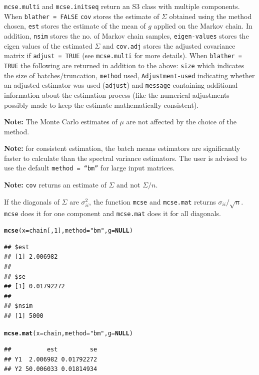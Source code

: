 \documentclass[11pt]{article}\usepackage[]{graphicx}\usepackage[]{color}
\makeatletter
\newcommand{\hlnum}[1]{\textcolor[rgb]{0.686,0.059,0.569}{#1}}%
\newcommand{\hlstr}[1]{\textcolor[rgb]{0.192,0.494,0.8}{#1}}%
\newcommand{\hlstd}[1]{\textcolor[rgb]{0.345,0.345,0.345}{#1}}%
\newcommand{\hlkwa}[1]{\textcolor[rgb]{0.161,0.373,0.58}{\textbf{#1}}}%
\newcommand{\hlkwc}[1]{\textcolor[rgb]{0.333,0.667,0.333}{#1}}%
\newcommand{\hlkwd}[1]{\textcolor[rgb]{0.737,0.353,0.396}{\textbf{#1}}}%
\newenvironment{kframe}{%
 \def\at@end@of@kframe{}%
 \ifinner\ifhmode%
  \def\at@end@of@kframe{\end{minipage}}%
  \begin{minipage}{\columnwidth}%
 \fi\fi%
 \def\FrameCommand##1{\hskip\@totalleftmargin \hskip-\fboxsep
 \colorbox{shadecolor}{##1}\hskip-\fboxsep
     \hskip-\linewidth \hskip-\@totalleftmargin \hskip\columnwidth}%
 \MakeFramed {\advance\hsize-\width
   \@totalleftmargin\z@ \linewidth\hsize
   \@setminipage}}%
 {\par\unskip\endMakeFramed%
 \at@end@of@kframe}
\newenvironment{knitrout}{}{} %
\makeatother
\begin{document}
\texttt{mcse.multi} and \texttt{mcse.initseq} return an S3 class with multiple components. When \texttt{blather = FALSE} \texttt{cov} stores the estimate of $\Sigma$ obtained using the method chosen, \texttt{est} stores the estimate of the mean of $g$ applied on the Markov chain. In addition, \texttt{nsim} stores the no. of Markov chain samples, \texttt{eigen-values} stores the eigen values of the estimated $\Sigma$ and \texttt{cov.adj} stores the adjusted covariance matrix if \texttt{adjust = TRUE} (see \texttt{mcse.multi} for more details). When \texttt{blather = TRUE} the following are returned in addition to the above: \texttt{size} which indicates the size of batches/truncation, \texttt{method} used, \texttt{Adjustment-used} indicating whether an adjusted estimator was used (\texttt{adjust}) and \texttt{message} containing additional information about the estimation process (like the numerical adjustments possibly made to keep the estimate mathematically consistent).


  
\bigskip  
  
\textbf{Note: } The Monte Carlo estimates of $\mu$ are not affected by the choice of the method.

\bigskip
\textbf{Note: } for consistent estimation, the batch means estimators are significantly faster to calculate than the spectral variance estimators. The user is advised to use the default \texttt{method = ``bm''} for large input matrices.

\bigskip
\textbf{Note: }\texttt{cov} returns an estimate of $\Sigma$ and not $\Sigma/n$. 

\bigskip
If the diagonals of $\Sigma$ are $\sigma_{ii}^2$, the function \texttt{mcse} and \texttt{mcse.mat} returns $\sigma_{ii}/\sqrt{n}$. \texttt{mcse} does it for one component and \texttt{mcse.mat} does it for all diagonals.


\begin{knitrout}
\color{fgcolor}\begin{kframe}
\begin{alltt}
\hlkwd{mcse}\hlstd{(}\hlkwc{x} \hlstd{= chain[,}\hlnum{1}\hlstd{],} \hlkwc{method} \hlstd{=} \hlstr{"bm"}\hlstd{,} \hlkwc{g} \hlstd{=} \hlkwa{NULL}\hlstd{)}
\end{alltt}
\begin{verbatim}
## $est
## [1] 2.006982
## 
## $se
## [1] 0.01792272
## 
## $nsim
## [1] 5000
\end{verbatim}
\begin{alltt}
\hlkwd{mcse.mat}\hlstd{(}\hlkwc{x} \hlstd{= chain,} \hlkwc{method} \hlstd{=} \hlstr{"bm"}\hlstd{,} \hlkwc{g} \hlstd{=} \hlkwa{NULL}\hlstd{)}
\end{alltt}
\begin{verbatim}
##          est         se
## Y1  2.006982 0.01792272
## Y2 50.006033 0.01814934
\end{verbatim}
\end{kframe}
\end{knitrout}
  
\end{document}
